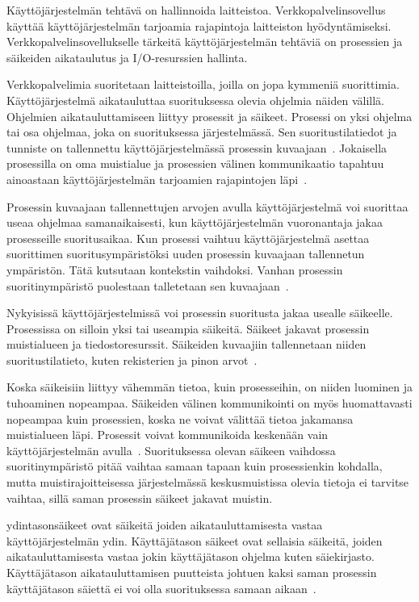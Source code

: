 \documentclass[finnish]{tktltiki2}%
\theoremstyle{definition}
\theoremstyle{remark}
\begin{document}
Käyttöjärjestelmän tehtävä on hallinnoida laitteistoa.
Verkkopalvelinsovellus käyttää käyttöjärjestelmän
tarjoamia rajapintoja laitteiston hyödyntämiseksi.
Verkkopalvelinsovellukselle tärkeitä
käyttöjärjestelmän tehtäviä on 
prosessien ja säikeiden aikataulutus ja I/O-resurssien hallinta.

Verkkopalvelimia suoritetaan laitteistoilla, joilla
on jopa kymmeniä suorittimia. Käyttöjärjestelmä
aikatauluttaa suorituksessa olevia ohjelmia näiden välillä.
Ohjelmien aikatauluttamiseen liittyy prosessit ja säikeet.
Prosessi on yksi ohjelma tai osa ohjelmaa, joka on suorituksessa järjestelmässä.
Sen suoritustilatiedot ja tunniste on
tallennettu käyttöjärjestelmässä prosessin kuvaajaan~\cite{stallings_operating_2018}.
Jokaisella
prosessilla on oma muistialue ja prosessien välinen kommunikaatio
tapahtuu ainoastaan käyttöjärjestelmän tarjoamien
rajapintojen läpi~\cite{stallings_operating_2018}.

Prosessin kuvaajaan tallennettujen arvojen avulla käyttöjärjestelmä
voi suorittaa useaa ohjelmaa samanaikaisesti, kun käyttöjärjestelmän
vuoronantaja jakaa prosesseille suoritusaikaa. Kun prosessi vaihtuu
käyttöjärjestelmä asettaa suorittimen suoritusympäristöksi
uuden prosessin kuvaajaan tallennetun ympäristön. Tätä kutsutaan kontekstin
vaihdoksi. Vanhan prosessin suoritinympäristö puolestaan talletetaan sen
kuvaajaan~\cite{stallings_operating_2018}.

Nykyisissä käyttöjärjestelmissä voi prosessin suoritusta jakaa usealle
säikeelle. Prosessissa on silloin yksi tai useampia säikeitä.
Säikeet jakavat prosessin muistialueen ja tiedostoresurssit.
Säikeiden kuvaajiin
tallennetaan niiden suoritustilatieto,
kuten rekisterien ja pinon arvot~\cite{stallings_operating_2018}.

Koska säikeisiin liittyy vähemmän tietoa, kuin prosesseihin,
on niiden luominen ja tuhoaminen nopeampaa. Säikeiden välinen
kommunikointi on myös huomattavasti nopeampaa kuin prosessien, koska
ne voivat välittää tietoa jakamansa muistialueen läpi.
Prosessit voivat kommunikoida keskenään vain käyttöjärjestelmän
avulla~\cite{stallings_operating_2018}.
Suorituksessa olevan säikeen
vaihdossa suoritinympäristö pitää vaihtaa
samaan tapaan kuin prosessienkin kohdalla, mutta muistirajoitteisessa
järjestelmässä keskusmuistissa olevia
tietoja ei tarvitse vaihtaa, sillä saman prosessin säikeet jakavat
muistin.

ydintasonsäikeet ovat säikeitä joiden aikatauluttamisesta vastaa
käyttöjärjestelmän ydin. Käyttäjätason säikeet ovat sellaisia säikeitä,
joiden aikatauluttamisesta vastaa jokin käyttäjätason ohjelma kuten
säiekirjasto. Käyttäjätason aikatauluttamisen puutteista johtuen
kaksi saman prosessin käyttäjätason säiettä ei voi olla suorituksessa
samaan aikaan~\cite{stallings_operating_2018}. 
\end{document}
